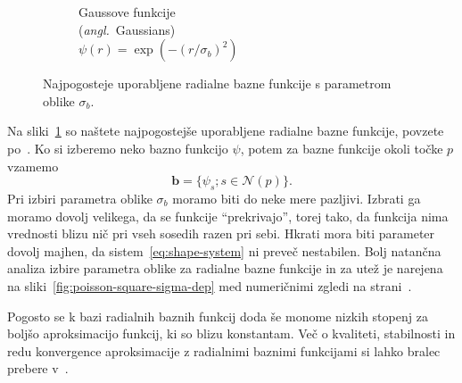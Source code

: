 \documentclass[12pt,a4paper,twoside]{article}
\theoremstyle{definition} %
\theoremstyle{plain} %
\numberwithin{equation}{section}
\newcommand{\Nc}{\mathcal{N}}
\renewcommand{\b}{\boldsymbol}
\newcommand{\ang}[1]{(\hspace{-1.5px}\textit{angl.}\ #1)}
\begin{document}
\begin{figure}[h]
\begin{subfigure}[t]{0.32\textwidth}
    \caption[Gaussove funkcije.]{Gaussove funkcije \\ \ang{Gaussians} \\ $\psi(r) = \exp(-(r/\sigma_b)^2)$}
  \end{subfigure}
  \caption[Najpogosteje uporabljene radialne bazne funkcije.]{Najpogosteje uporabljene radialne bazne
  funkcije s parametrom oblike $\sigma_b$.}
  \label{fig:rbf}
\end{figure}



Na sliki~\ref{fig:rbf} so naštete najpogostejše uporabljene radialne bazne funkcije, povzete
po~\cite[str.\ 5]{schaback1995error}.
Ko si izberemo neko bazno funkcijo $\psi$, potem za bazne funkcije okoli točke
$p$ vzamemo
\begin{equation}
   \b b = \{\psi_s; s \in \Nc(p) \}.
\end{equation}
Pri izbiri parametra oblike $\sigma_b$ moramo biti do neke mere pazljivi. Izbrati
ga moramo dovolj velikega, da se funkcije ``prekrivajo'', torej tako, da funkcija
nima vrednosti blizu nič pri vseh sosedih razen pri sebi. Hkrati mora biti
parameter dovolj majhen, da sistem~\eqref{eq:shape-system} ni preveč nestabilen.
Bolj natančna analiza izbire parametra oblike za radialne bazne funkcije in
za utež je narejena na sliki~\ref{fig:poisson-square-sigma-dep} med numeričnimi
zgledi na strani~\pageref{fig:poisson-square-sigma-dep}.

Pogosto se k bazi radialnih baznih funkcij doda še monome nizkih stopenj za
boljšo aproksimacijo funkcij, ki so blizu konstantam. Več o kvaliteti,
stabilnosti in redu konvergence aproksimacije z radialnimi baznimi funkcijami
si lahko bralec prebere v~\cite{buhmann2000radial}.
\end{document}
